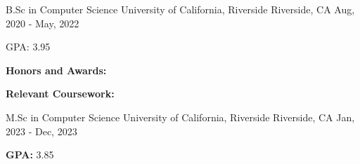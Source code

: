 
\begin{cventries}
  \cventry
    {B.Sc in Computer Science} %
    {University of California, Riverside} %
    {Riverside, CA} %
    {Aug, 2020 -  May, 2022} %
    {
      \begin{cvitems} %
        \item {GPA: 3.95}
        \item [] \textbf{Honors and Awards:}
        \item []
        \begin{flushleft}
          \textbf{Relevant Coursework:}
        \end{flushleft}
      \end{cvitems}
    }
    
  \cventry
    {M.Sc in Computer Science } %
    {University of California, Riverside} %
    {Riverside, CA} %
    {Jan, 2023 - Dec, 2023} %
    {
      \begin{cvitems}
        \item {\textbf{GPA:} 3.85}
      \end{cvitems}
    }
\end{cventries}
